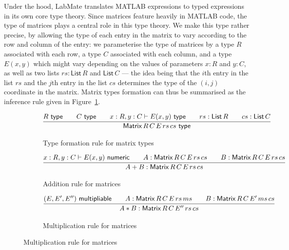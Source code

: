 \documentclass{IMEKO2024}
\newcommand{\istype}[1]{#1\ \textsf{type}}
\newcommand{\isadd}[1]{#1\ \textsf{numeric}}
\newcommand{\ismult}[3]{(#1, #2, #3)\ \textsf{multipliable}}
\newcommand{\Matrix}[5]{\mathsf{Matrix}\,#1\,#2\,#3\,#4\,#5}
\newcommand{\List}[1]{\mathsf{List}\,#1}
\begin{document}
Under the hood, LabMate translates MATLAB expressions to typed
expressions in its own core type theory.
%
Since matrices feature heavily in MATLAB code, the type of matrices
plays a central role in this type theory.
%
We make this type rather precise, by allowing the type of each entry
in the matrix to vary according to the row and column of the entry:
%
we parameterise the type of matrices by a type $R$ associated with
each row, a type $C$ associated with each column, and a type $E(x,y)$
which might vary depending on the values of parameters $x : R$ and
$y : C$, as well as two lists $rs : \List{R}$ and $\List{C}$ --- the
idea being that the $i$th entry in the list $rs$ and the $j$th entry
in the list $cs$ determines the type of the $(i, j)$ coordinate in the
matrix.
%
Matrix types formation can thus be summarised as the inference rule given in Figure~\ref{fig:matrix_intro}.
%
\begin{figure}[th]
\begin{subfigure}{\textwidth}
  \begin{center}
    \[
      \infer{\istype{\Matrix{R}{C}{E}{rs}{cs}}}
      {
        \istype{R}
        &\quad
        \istype{C}
        &\quad
        x : R, y : C \vdash \istype{E(x,y)}
        &\quad
        rs : \List{R}
        &\quad
        cs : \List{C}
      }
    \]
  \end{center}
  \caption{Type formation rule for matrix types}
  \label{fig:matrix_intro}
\end{subfigure}
\hfill
\begin{subfigure}{\textwidth}
  \begin{center}
    \[
      \infer{A + B : \Matrix{R}{C}{E}{rs}{cs}}
      {
        x : R, y : C \vdash \isadd{E(x, y)}
        &\quad
        A : \Matrix{R}{C}{E}{rs}{cs}
        &\quad
        B : \Matrix{R}{C}{E}{rs}{cs}
      }
    \]
  \end{center}
  \caption{Addition rule for matrices}
  \label{fig:matrix_add}
\end{subfigure}
\hfill
\begin{subfigure}{\textwidth}
  \begin{center}
    \[
      \infer{A * B : \Matrix{R}{C}{E''}{rs}{cs}}
      {
        \ismult{E}{E'}{E''}
        &\quad
        A : \Matrix{R}{C}{E}{rs}{ms}
        &\quad
        B : \Matrix{R}{C}{E'}{ms}{cs}
      }
    \]
  \end{center}
  \caption{Multiplication rule for matrices}
  \label{fig:matrix_mul}
\end{subfigure}
\label{fig:matrix_rules}
\end{figure}
\end{document}

